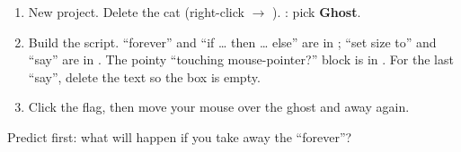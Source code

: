 \begin{exercise}
\begin{enumerate}[leftmargin=1.4em,itemsep=1pt]
  \item New project. Delete the cat (right-click $\rightarrow$ ). : pick \textbf{Ghost}.
  \item Build the script. \enquote{forever} and \enquote{if \ldots{} then \ldots{} else} are in ; \enquote{set size to} and \enquote{say} are in . The pointy \enquote{touching mouse-pointer?} block is in . For the last \enquote{say}, delete the text so the box is empty.
  \item Click the flag, then move your mouse over the ghost and away again.
\end{enumerate}
\begin{center}
\begin{scratch}[scale=0.85,else word=else]
\end{scratch}
\end{center}
Predict first: what will happen if you take away the \enquote{forever}? 
\end{exercise}

